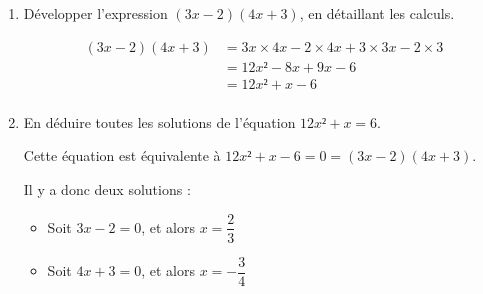 \documentclass[
	classe=$2^{de}$,
]{évaluation}
\begin{document}
\begin{exercice}[2,5]
	\begin{enumerate}
		\item Développer l'expression $(3x - 2)(4x + 3)$, en détaillant les calculs.

			      {\color{red}\begin{align*}
					      (3x - 2)(4x + 3) & = 3x × 4x - 2 × 4x + 3 × 3x - 2 × 3 \\
					                       & = 12x² - 8x + 9x - 6                \\
					                       & = 12x² + x - 6                      \\
				      \end{align*}}
		\item En déduire toutes les solutions de l'équation $12x² + x = 6$.

			      {\color{red}Cette équation est équivalente à $12x² + x - 6 = 0 = (3x - 2)(4x + 3)$.

				      Il y a donc deux solutions :
				      \begin{itemize}
					      \item Soit $3x - 2 = 0$, et alors $x = \dfrac{2}{3}$
					      \item Soit $4x + 3 = 0$, et alors $x = -\dfrac{3}{4}$
				      \end{itemize}}
	\end{enumerate}
\end{exercice}
\end{document}
